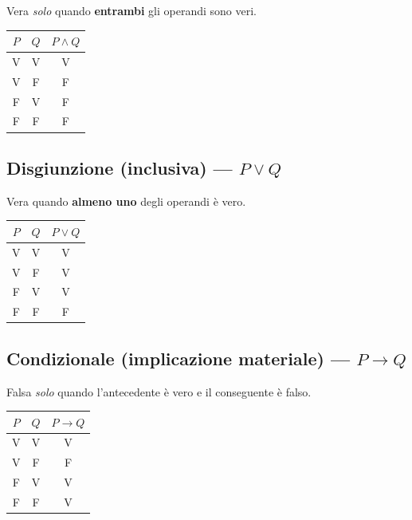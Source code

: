 \documentclass[10pt,a4paper]{article}
\begin{document}
Vera \emph{solo} quando \textbf{entrambi} gli operandi sono veri.

\begin{center}
\renewcommand{\arraystretch}{1.3}
\begin{tabular}{cc|c}
  \toprule
  $P$ & $Q$ & $P \land Q$ \\
  \midrule
  V & V & V \\
  V & F & F \\
  F & V & F \\
  F & F & F \\
  \bottomrule
\end{tabular}
\end{center}

\subsection{Disgiunzione (inclusiva) --- $P \lor Q$}

Vera quando \textbf{almeno uno} degli operandi è vero.

\begin{center}
\renewcommand{\arraystretch}{1.3}
\begin{tabular}{cc|c}
  \toprule
  $P$ & $Q$ & $P \lor Q$ \\
  \midrule
  V & V & V \\
  V & F & V \\
  F & V & V \\
  F & F & F \\
  \bottomrule
\end{tabular}
\end{center}

\subsection{Condizionale (implicazione materiale) --- $P \to Q$}

Falsa \emph{solo} quando l'antecedente è vero e il conseguente è falso.

\begin{center}
\renewcommand{\arraystretch}{1.3}
\begin{tabular}{cc|c}
  \toprule
  $P$ & $Q$ & $P \to Q$ \\
  \midrule
  V & V & V \\
  V & F & F \\
  F & V & V \\
  F & F & V \\
  \bottomrule
\end{tabular}
\end{center}
\end{document}

